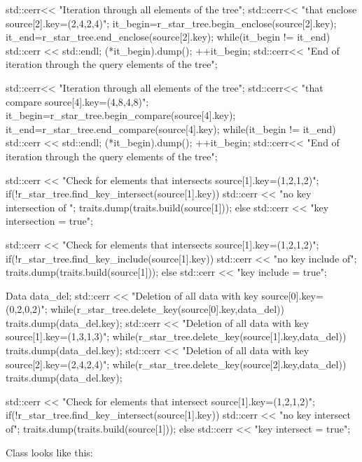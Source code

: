 \begin{cprog}
{  std::cerr<< "Iteration through all elements of the tree\n";
  std::cerr<< "that enclose source[2].key=(2,4,2,4)\n";
  it_begin=r_star_tree.begin_enclose(source[2].key);
  it_end=r_star_tree.end_enclose(source[2].key);
  while(it_begin != it_end){
    std::cerr << std::endl;
    (*it_begin).dump();
    ++it_begin;
  }
  std::cerr<< "End of iteration through the query elements of the tree\n";

  std::cerr<< "Iteration through all elements of the tree\n";
  std::cerr<< "that compare source[4].key=(4,8,4,8)\n";
  it_begin=r_star_tree.begin_compare(source[4].key);
  it_end=r_star_tree.end_compare(source[4].key);
  while(it_begin != it_end){
    std::cerr << std::endl;
    (*it_begin).dump();
    ++it_begin;
  }
  std::cerr<< "End of iteration through the query elements of the tree\n";

  std::cerr << "Check for elements that intersects source[1].key=(1,2,1,2)\n";
  if(!r_star_tree.find_key_intersect(source[1].key))
    {
      std::cerr << "no key intersection of "; 
      traits.dump(traits.build(source[1]));
    }
  else
    std::cerr << "key intersection = true";

  std::cerr << "Check for elements that intersects source[1].key=(1,2,1,2)\n";
  if(!r_star_tree.find_key_include(source[1].key))
    {
      std::cerr << "no key include of"; 
      traits.dump(traits.build(source[1]));
    }
  else
    std::cerr << "key include = true";

  Data data_del;
  std::cerr << "Deletion of all data with key source[0].key=(0,2,0,2)\n";
  while(r_star_tree.delete_key(source[0].key,data_del))
    traits.dump(data_del.key);
  std::cerr << "Deletion of all data with key source[1].key=(1,3,1,3)\n";
  while(r_star_tree.delete_key(source[1].key,data_del))
    traits.dump(data_del.key);
  std::cerr << "Deletion of all data with key source[2].key=(2,4,2,4)\n";
  while(r_star_tree.delete_key(source[2].key,data_del))
    traits.dump(data_del.key);

  std::cerr << "Check for elements that intersect source[1].key=(1,2,1,2)\n";
  if(!r_star_tree.find_key_intersect(source[1].key))
    {
      std::cerr << "no key intersect of"; 
      traits.dump(traits.build(source[1]));
    }
  else
    std::cerr << "key intersect = true";
}
\end{cprog}

Class  looks like this:


